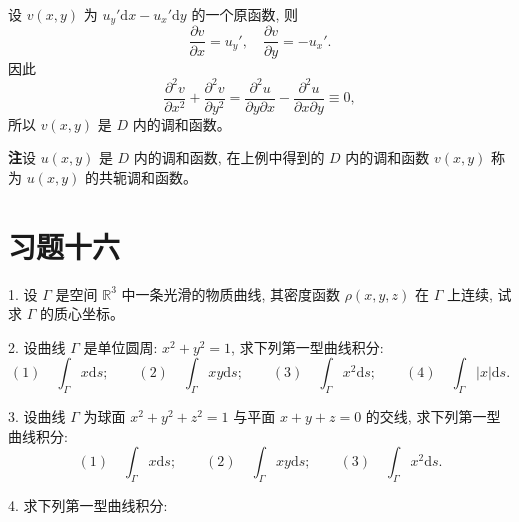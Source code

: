 \documentclass[UTF8, 12pt, fontset=fandol, oneside]{ctexart}
\begin{document}
设 $v(x,y)$ 为 $u_y'\mathrm dx-u_x'\mathrm dy$ 的一个原函数, 则
\[
  \frac{\partial v}{\partial x}=u_y',
  \quad
  \frac{\partial v}{\partial y}=-u_x'.
\]
因此
\[
  \frac{\partial^2v}{\partial x^2}+\frac{\partial^2v}{\partial y^2}
  =
  \frac{\partial^2u}{\partial y\partial x}
  -
  \frac{\partial^2u}{\partial x\partial y}
  \equiv0,
\]
所以 $v(x,y)$ 是 $D$ 内的调和函数。

\noindent\textbf{注}\quad 设 $u(x,y)$ 是 $D$ 内的调和函数, 在上例中得到的 $D$ 内的调和函数 $v(x,y)$ 称为 $u(x,y)$ 的共轭调和函数。

\section*{习题十六}

1. 设 $\Gamma$ 是空间 $\mathbb R^3$ 中一条光滑的物质曲线, 其密度函数 $\rho(x,y,z)$ 在 $\Gamma$ 上连续, 试求 $\Gamma$ 的质心坐标。

2. 设曲线 $\Gamma$ 是单位圆周: $x^2+y^2=1$, 求下列第一型曲线积分:
\[
  (1)\quad \int_\Gamma x\mathrm ds;\qquad
  (2)\quad \int_\Gamma xy\mathrm ds;\qquad
  (3)\quad \int_\Gamma x^2\mathrm ds;\qquad
  (4)\quad \int_\Gamma |x|\mathrm ds.
\]

3. 设曲线 $\Gamma$ 为球面 $x^2+y^2+z^2=1$ 与平面 $x+y+z=0$ 的交线, 求下列第一型曲线积分:
\[
  (1)\quad \int_\Gamma x\mathrm ds;\qquad
  (2)\quad \int_\Gamma xy\mathrm ds;\qquad
  (3)\quad \int_\Gamma x^2\mathrm ds.
\]

4. 求下列第一型曲线积分:
\end{document}
